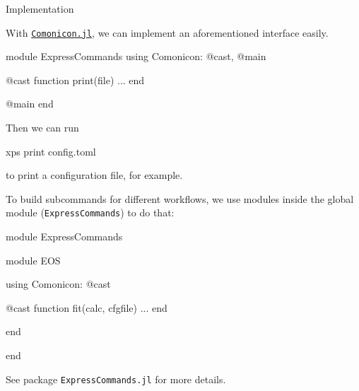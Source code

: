 \begin{frame}{Implementation}

    With \href{https://github.com/comonicon/Comonicon.jl}{\texttt{Comonicon.jl}}, we can implement
    an aforementioned interface easily.

        {\scriptsize
            \begin{algorithmblock}
                \begin{juliaverbatim}
module ExpressCommands
using Comonicon: @cast, @main

@cast function print(file)
    ...
end

@main
end
                \end{juliaverbatim}
            \end{algorithmblock}
        }

    Then we can run

        {\scriptsize
            \begin{algorithmblock}
                xps print config.toml
            \end{algorithmblock}
        }

    to print a configuration file, for example.

    \framebreak

    To build subcommands for different workflows, we use modules inside the global module
    (\texttt{ExpressCommands}) to do that:

    {\scriptsize
    \begin{algorithmblock}
        \begin{juliaverbatim}
module ExpressCommands

module EOS

using Comonicon: @cast

@cast function fit(calc, cfgfile)
    ...
end

end

end
        \end{juliaverbatim}
    \end{algorithmblock}
    }

    See package \texttt{ExpressCommands.jl} for more details.
\end{frame}



